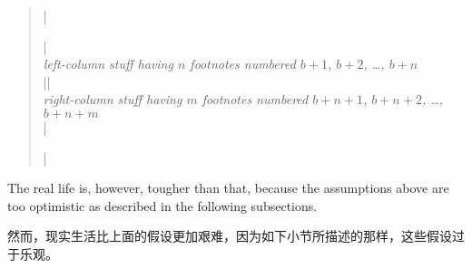 \begin{quote}\vskip-1pt
|\begin{paracol}{2}|\\
\textit{left-column stuff having $n$ footnotes numbered $b+1$, $b+2$,
\ldots, $b+n$}\\
|\switchcolumn|\\
\textit{right-column stuff having $m$ footnotes numbered $b+n+1$, $b+n+2$,
\ldots, $b+n+m$}\\
|\end{paracol}|
\end{quote}\vskip-1pt

The real life is, however, tougher than that, because the assumptions above
are too optimistic as described in the following subsections.

然而，现实生活比上面的假设更加艰难，因为如下小节所描述的那样，这些假设过于乐观。
\vskip-3pt\vskip0pt